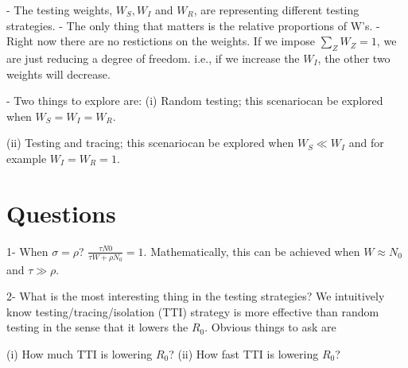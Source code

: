 - The testing weights, $W_S, W_I$ and $W_R$, are representing different testing strategies.
- The only thing that matters is the relative proportions of W's.
- Right now there are no restictions on the weights. If we impose $\sum_Z W_Z=1$, we are just reducing a degree of freedom. i.e., if we increase the $W_I$, the other two weights will decrease.

- Two things to explore are: 
(i) Random testing; this scenariocan be explored when $W_S=W_I=W_R$.

(ii) Testing and tracing; this scenariocan be explored when $W_S \ll W_I$ and for example $W_I=W_R=1$.

\section{Questions}

1- When $\sigma=\rho$?  
  $\frac{\tau N0}{\tau W+ \rho N_0} = 1$. Mathematically, this can be achieved when $W \approx N_0$ and   $\tau \gg \rho$.

2- What is the most interesting thing in the testing strategies?
We intuitively know testing/tracing/isolation (TTI) strategy is more effective than random testing in the sense that it lowers the $R_0$. Obvious things to ask are

(i)  How much TTI is lowering $R_0$? 
(ii) How fast TTI is lowering $R_0$?


